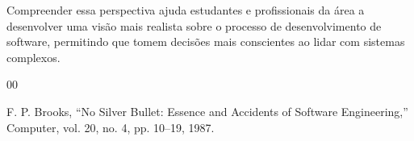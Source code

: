 \documentclass[conference]{IEEEtran}
\begin{document}
Compreender essa perspectiva ajuda estudantes e profissionais da área a desenvolver uma visão mais realista sobre o processo de desenvolvimento de software, permitindo que tomem decisões mais conscientes ao lidar com sistemas complexos.

\begin{thebibliography}{00}

F. P. Brooks,
``No Silver Bullet: Essence and Accidents of Software Engineering,''
Computer, vol. 20, no. 4, pp. 10--19, 1987.

\end{thebibliography}
\end{document}
